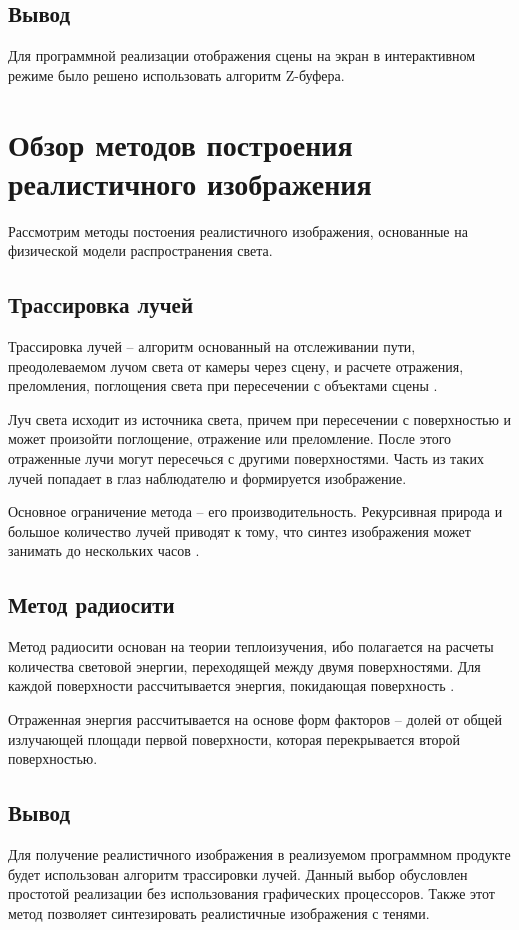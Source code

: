 \subsection{Вывод}

Для программной реализации отображения сцены на экран в интерактивном режиме было решено использовать алгоритм Z-буфера.

\section{Обзор методов построения реалистичного изображения}

Рассмотрим методы постоения реалистичного изображения, основанные на физической модели распространения света.

\subsection{Трассировка лучей}

Трассировка лучей -- алгоритм основанный на отслеживании пути, преодолеваемом лучом света от камеры через сцену, и расчете отражения, преломления, поглощения света при пересечении с объектами сцены \cite{ray-tracing}.

Луч света исходит из источника света, причем при пересечении с поверхностью и может произойти поглощение, отражение или преломление. После этого отраженные лучи могут пересечься с другими поверхностями. Часть из таких лучей попадает в глаз наблюдателю и формируется изображение.

Основное ограничение метода -- его производительность. Рекурсивная природа и большое количество лучей приводят к тому, что синтез изображения может занимать до нескольких часов \cite{popov}.

\subsection{Метод радиосити}

Метод радиосити основан на теории теплоизучения, ибо полагается на расчеты количества световой энергии, переходящей между двумя поверхностями. Для каждой поверхности рассчитывается энергия, покидающая поверхность \cite{radiocity}.

Отраженная энергия рассчитывается на основе форм факторов -- долей от общей излучающей площади первой поверхности, которая перекрывается второй поверхностью.

\subsection{Вывод}

Для получение реалистичного изображения в реализуемом программном продукте будет использован алгоритм трассировки лучей. Данный выбор обусловлен простотой реализации без использования графических процессоров. Также этот метод позволяет синтезировать реалистичные изображения с тенями.
